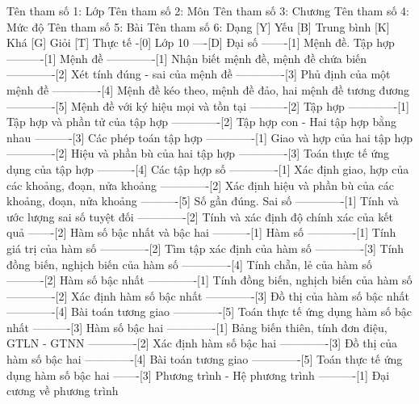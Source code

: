 %
%
%
%
%
Tên tham số 1: Lớp
Tên tham số 2: Môn
Tên tham số 3: Chương
Tên tham số 4: Mức độ
Tên tham số 5: Bài
Tên tham số 6: Dạng
%
%
[Y] Yếu
[B] Trung bình
[K] Khá
[G] Giỏi
[T] Thực tế
%
%
-[0] Lớp 10
----[D] Đại số
-------[1] Mệnh đề. Tập hợp
----------[1] Mệnh đề
-------------[1] Nhận biết mệnh đề, mệnh đề chứa biến
-------------[2] Xét tính đúng - sai của mệnh đề
-------------[3] Phủ định của một mệnh đề
-------------[4] Mệnh đề kéo theo, mệnh đề đảo, hai mệnh đề tương đương
-------------[5] Mệnh đề với ký hiệu mọi và tồn tại
----------[2] Tập hợp
-------------[1] Tập hợp và phần tử của tập hợp
-------------[2] Tập hợp con - Hai tập hợp bằng nhau
----------[3] Các phép toán tập hợp
-------------[1] Giao và hợp của hai tập hợp
-------------[2] Hiệu và phần bù của hai tập hợp
-------------[3] Toán thực tế ứng dụng của tập hợp
----------[4] Các tập hợp số
-------------[1] Xác định giao, hợp của các khoảng, đoạn, nửa khoảng
-------------[2] Xác định hiệu và phần bù của các khoảng, đoạn, nửa khoảng
----------[5] Số gần đúng. Sai số
-------------[1] Tính và ước lượng sai số tuyệt đối
-------------[2] Tính và xác định độ chính xác của kết quả
-------[2] Hàm số bậc nhất và bậc hai
----------[1] Hàm số
-------------[1] Tính giá trị của hàm số
-------------[2] Tìm tập xác định của hàm số
-------------[3] Tính đồng biến, nghịch biến của hàm số
-------------[4] Tính chẵn, lẻ của hàm số
----------[2] Hàm số bậc nhất
-------------[1] Tính đồng biến, nghịch biến của hàm số
-------------[2] Xác định hàm số bậc nhất
-------------[3] Đồ thị của hàm số bậc nhất
-------------[4] Bài toán tương giao
-------------[5] Toán thực tế ứng dụng hàm số bậc nhất
----------[3] Hàm số bậc hai
-------------[1] Bảng biến thiên, tính đơn điệu, GTLN - GTNN
-------------[2] Xác định hàm số bậc hai
-------------[3] Đồ thị của hàm số bậc hai
-------------[4] Bài toán tương giao
-------------[5] Toán thực tế ứng dụng hàm số bậc hai
-------[3] Phương trình - Hệ phương trình
----------[1] Đại cương về phương trình
